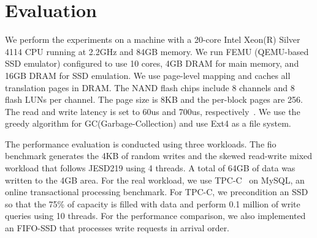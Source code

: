\iffalse
\begin{figure*}[!t]
    \centering{}
	\subfloat[Random] { 
	    \texttt{[image: expr/micro\_rslt\_220525/wt/RAND.eps]}
	} 
	\subfloat[JESD] { 
	    \texttt{[image: expr/micro\_rslt\_220525/wt/JESD.eps]}
	}
	\subfloat[TPC-C] { 
	    \texttt{[image: expr/macro\_rslt\_220601/waf/OLTP.eps]}
	}
	\caption{\textbf{Write Traffic.} \textit{UD - User Data, MD - Mapping Data, GUD - GC Write for User Data, GMD - GC Write for Mapping Data.}}
    \label{fig_perf_wt}
\end{figure*} 
\fi



\section{Evaluation}
We perform the experiments on a machine with a 20-core Intel Xeon(R) Silver
4114 CPU running at 2.2GHz and 84GB memory. We run FEMU (QEMU-based SSD
emulator) configured to use 10 cores, 4GB DRAM for main memory, and 16GB DRAM
for SSD emulation. We use page-level mapping and caches all translation pages in DRAM. 
The NAND flash chips include 8 channels and 8 flash
LUNs per channel. The page size is 8KB and the per-block pages are 256. The
read and write latency is set to 60us and 700us,
respectively~\cite{cheong2018flash}. We use the greedy algorithm for
GC(Garbage-Collection) and use Ext4 as a file system. 

The performance evaluation is conducted using three workloads.
The fio benchmark generates the 4KB of random writes and the
skewed read-write mixed workload that follows JESD219 using 4 threads. A
total of 64GB of data was written to the 4GB area. For the real workload, we use 
TPC-C~\cite{council1990tpc} on MySQL, an online transactional processing benchmark.
For TPC-C, we precondition an SSD so that the 75\% of capacity is filled with data
and perform 0.1 million of write queries using 10 threads.
For the performance comparison, we also implemented an FIFO-SSD that processes 
write requests in arrival order.  

